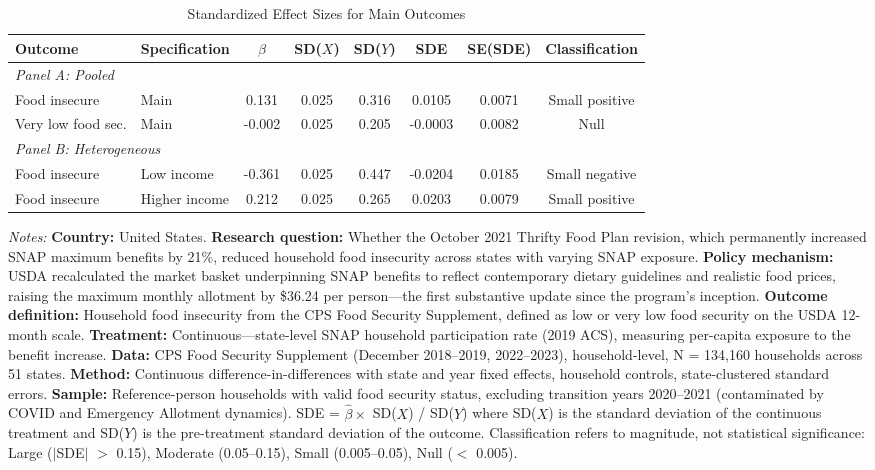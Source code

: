 \begin{table}[H]
\centering
\caption{Standardized Effect Sizes for Main Outcomes}
\label{tab:sde}
\begin{threeparttable}
\begin{adjustbox}{max width=\textwidth}
\begin{tabular}{llcccccc}
\toprule
Outcome & Specification & $\hat{\beta}$ & SD($X$) & SD($Y$) & SDE & SE(SDE) & Classification \\
\midrule
\multicolumn{8}{l}{\textit{Panel A: Pooled}} \\
Food insecure & Main & 0.131 & 0.025 & 0.316 & 0.0105 & 0.0071 & Small positive \\
Very low food sec. & Main & -0.002 & 0.025 & 0.205 & -0.0003 & 0.0082 & Null \\
\midrule
\multicolumn{8}{l}{\textit{Panel B: Heterogeneous}} \\
Food insecure & Low income & -0.361 & 0.025 & 0.447 & -0.0204 & 0.0185 & Small negative \\
Food insecure & Higher income & 0.212 & 0.025 & 0.265 & 0.0203 & 0.0079 & Small positive \\
\bottomrule
\end{tabular}
\end{adjustbox}
\end{threeparttable}
\par\vspace{0.3em}
{\scriptsize
\item \textit{Notes:} \textbf{Country:} United States. \textbf{Research question:} Whether the October 2021 Thrifty Food Plan revision, which permanently increased SNAP maximum benefits by 21\%, reduced household food insecurity across states with varying SNAP exposure. \textbf{Policy mechanism:} USDA recalculated the market basket underpinning SNAP benefits to reflect contemporary dietary guidelines and realistic food prices, raising the maximum monthly allotment by \$36.24 per person---the first substantive update since the program's inception. \textbf{Outcome definition:} Household food insecurity from the CPS Food Security Supplement, defined as low or very low food security on the USDA 12-month scale. \textbf{Treatment:} Continuous---state-level SNAP household participation rate (2019 ACS), measuring per-capita exposure to the benefit increase. \textbf{Data:} CPS Food Security Supplement (December 2018--2019, 2022--2023), household-level, N = 134,160 households across 51 states. \textbf{Method:} Continuous difference-in-differences with state and year fixed effects, household controls, state-clustered standard errors. \textbf{Sample:} Reference-person households with valid food security status, excluding transition years 2020--2021 (contaminated by COVID and Emergency Allotment dynamics). SDE = $\hat{\beta} \times$ SD($X$) / SD($Y$) where SD($X$) is the standard deviation of the continuous treatment and SD($Y$) is the pre-treatment standard deviation of the outcome. Classification refers to magnitude, not statistical significance: Large ($|$SDE$|$ $>$ 0.15), Moderate (0.05--0.15), Small (0.005--0.05), Null ($<$ 0.005).
}
\end{table}
